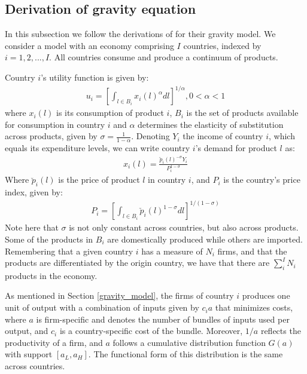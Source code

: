 \subsection{Derivation of \cite{helpman2008estimating} gravity equation} \label{gravity_model_derivation}
In this subsection we follow the derivations of \cite{helpman2008estimating} for their gravity model.
We consider a model with an economy comprising $I$ countries, indexed by $i=1,2,...,I$. All countries consume and produce a continuum of products.

Country $i$'s utility function is given by:
\begin{align}
    u_{i}=\left[\int_{l \in B_{i}} x_{i}(l)^{\alpha} d l\right]^{1 / \alpha}, 0<\alpha<1
\end{align}
\noindent where $x_i(l)$ is its consumption of product $i$, $B_i$ is the set of products available for consumption in country $i$ and $\alpha$ determines the elasticity of substitution across products, given by $\sigma = \frac{1}{1-\alpha}$.
Denoting $Y_i$ the income of country $i$, which equals its expenditure levels, we can write country $i$'s demand for product $l$ as:
\begin{align}
x_{i}(l)=\frac{\breve{p}_{i}(l)^{-\sigma} Y_{i}}{P_{i}^{1-\sigma}}
\end{align}
Where $\breve{p}_{i}(l)$ is the price of product $l$ in country $i$, and $P_i$ is the country's price index, given by:
\begin{align} \label{price_index}
P_{i}=\left[\int_{l \in B_{i}} \check{p}_{i}(l)^{1-\sigma} d l\right]^{1 /(1-\sigma)}
\end{align}
Note here that $\sigma$ is not only constant across countries, but also across products. Some of the products in $B_i$ are domestically produced while others are imported. Remembering that a given country $i$ has a measure of $N_i$ firms, and that the products are differentiated by the origin country, we have that there are $\sum_i^I N_i$ products in the economy.

As mentioned in Section \ref{gravity_model}, the firms of country $i$ produces one unit of output with a combination of inputs given by $c_i a$ that minimizes costs, where $a$ is firm-specific and denotes the number of bundles of inputs used per output, and $c_i$ is a country-specific cost of the bundle. Moreover, $1/a$ reflects the productivity of a firm, and $a$ follows a cumulative distribution function $G(a)$ with support $[a_L, a_H]$. The functional form of this distribution is the same across countries. 

